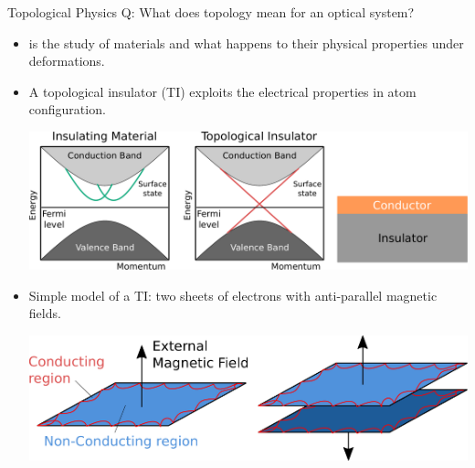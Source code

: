 \documentclass[fleqn,t,serif,10pt,aspectratio=141,compress]{beamer}
\begin{document}
\begin{frame}{Topological Physics}
    Q: What does topology mean for an optical system?
    \begin{itemize}
        \item 
             is the study of materials and what happens to their
            physical properties under deformations.
        \item A topological insulator (TI) exploits the electrical properties in atom configuration.
            \begin{center}
                \includegraphics[width=.75\textwidth]{TI-figur.pdf}
            \end{center}
        \item Simple model of a TI: two sheets of electrons with anti-parallel magnetic fields.
            \begin{center}
                \includegraphics[width=.75\textwidth]{TI-electron-sheet-model.pdf}
            \end{center}
    \end{itemize}
\end{frame}
\end{document}
